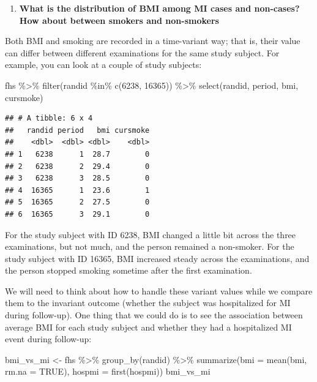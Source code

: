 \documentclass[
]{book}
\newenvironment{Shaded}{\begin{snugshade}}{\end{snugshade}}
\newcommand{\AttributeTok}[1]{\textcolor[rgb]{0.77,0.63,0.00}{#1}}
\newcommand{\ConstantTok}[1]{\textcolor[rgb]{0.00,0.00,0.00}{#1}}
\newcommand{\DecValTok}[1]{\textcolor[rgb]{0.00,0.00,0.81}{#1}}
\newcommand{\FunctionTok}[1]{\textcolor[rgb]{0.00,0.00,0.00}{#1}}
\newcommand{\NormalTok}[1]{#1}
\newcommand{\OtherTok}[1]{\textcolor[rgb]{0.56,0.35,0.01}{#1}}
\newcommand{\SpecialCharTok}[1]{\textcolor[rgb]{0.00,0.00,0.00}{#1}}
\providecommand{\tightlist}{%
  \setlength{\itemsep}{0pt}\setlength{\parskip}{0pt}}
\begin{document}
\begin{enumerate}
\def\labelenumi{\arabic{enumi}.}
\setcounter{enumi}{3}
\tightlist
\item
  \textbf{What is the distribution of BMI among MI cases and non-cases? How about between smokers and non-smokers}
\end{enumerate}

Both BMI and smoking are recorded in a time-variant way; that is, their value can differ between different examinations for the same study subject. For example, you can look at a couple of study subjects:

\begin{Shaded}
\begin{Highlighting}[]
\NormalTok{fhs }\SpecialCharTok{\%\textgreater{}\%} 
  \FunctionTok{filter}\NormalTok{(randid }\SpecialCharTok{\%in\%} \FunctionTok{c}\NormalTok{(}\DecValTok{6238}\NormalTok{, }\DecValTok{16365}\NormalTok{)) }\SpecialCharTok{\%\textgreater{}\%} 
  \FunctionTok{select}\NormalTok{(randid, period, bmi, cursmoke)}
\end{Highlighting}
\end{Shaded}

\begin{verbatim}
## # A tibble: 6 x 4
##   randid period   bmi cursmoke
##    <dbl>  <dbl> <dbl>    <dbl>
## 1   6238      1  28.7        0
## 2   6238      2  29.4        0
## 3   6238      3  28.5        0
## 4  16365      1  23.6        1
## 5  16365      2  27.5        0
## 6  16365      3  29.1        0
\end{verbatim}

For the study subject with ID 6238, BMI changed a little bit across the three examinations, but not much, and the person remained a non-smoker. For the study subject with ID 16365, BMI increased steady across the examinations, and the person stopped smoking sometime after the first examination.

We will need to think about how to handle these variant values while we compare them to the invariant outcome (whether the subject was hospitalized for MI during follow-up). One thing that we could do is to see the association between average BMI for each study subject and whether they had a hospitalized MI event during follow-up:

\begin{Shaded}
\begin{Highlighting}[]
\NormalTok{bmi\_vs\_mi }\OtherTok{\textless{}{-}}\NormalTok{ fhs }\SpecialCharTok{\%\textgreater{}\%} 
  \FunctionTok{group\_by}\NormalTok{(randid) }\SpecialCharTok{\%\textgreater{}\%} 
  \FunctionTok{summarize}\NormalTok{(}\AttributeTok{bmi =} \FunctionTok{mean}\NormalTok{(bmi, }\AttributeTok{rm.na =} \ConstantTok{TRUE}\NormalTok{), }
            \AttributeTok{hospmi =} \FunctionTok{first}\NormalTok{(hospmi))}
\NormalTok{bmi\_vs\_mi}
\end{Highlighting}
\end{Shaded}
\end{document}
